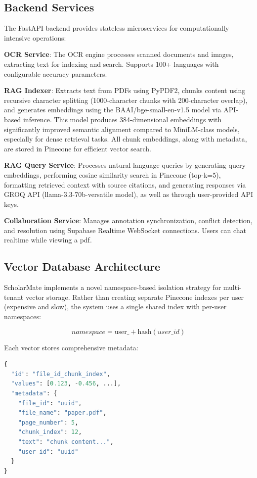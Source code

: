 \documentclass[conference]{IEEEtran}
\begin{document}
\subsection{Backend Services}

The FastAPI backend provides stateless microservices for computationally intensive operations:

\textbf{OCR Service}: The OCR engine processes scanned documents and images, extracting text for indexing and search. Supports 100+ languages with configurable accuracy parameters.

\textbf{RAG Indexer}: Extracts text from PDFs using PyPDF2, chunks content using recursive character splitting (1000-character chunks with 200-character overlap), and generates embeddings using the BAAI/bge-small-en-v1.5 model via API-based inference. This model produces 384-dimensional embeddings with significantly improved semantic alignment compared to MiniLM-class models, especially for dense retrieval tasks. All chunk embeddings, along with metadata, are stored in Pinecone for efficient vector search.


\textbf{RAG Query Service}: Processes natural language queries by generating query embeddings, performing cosine similarity search in Pinecone (top-k=5), formatting retrieved context with source citations, and generating responses via GROQ API (llama-3.3-70b-versatile model), as well as through user-provided API keys.

\textbf{Collaboration Service}: Manages annotation synchronization, conflict detection, and resolution using Supabase Realtime WebSocket connections. Users can chat realtime while viewing a pdf.

\subsection{Vector Database Architecture}

ScholarMate implements a novel namespace-based isolation strategy for multi-tenant vector storage. Rather than creating separate Pinecone indexes per user (expensive and slow), the system uses a single shared index with per-user namespaces:

\begin{equation}
namespace = \text{user\_} + \text{hash}(user\_id)
\end{equation}

Each vector stores comprehensive metadata:

\begin{lstlisting}[language=Python, basicstyle=\tiny]
{
  "id": "file_id_chunk_index",
  "values": [0.123, -0.456, ...],
  "metadata": {
    "file_id": "uuid",
    "file_name": "paper.pdf",
    "page_number": 5,
    "chunk_index": 12,
    "text": "chunk content...",
    "user_id": "uuid"
  }
}
\end{lstlisting}
\end{document}
